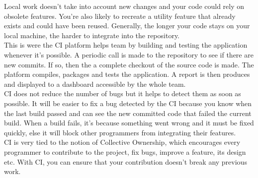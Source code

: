 Local work doesn't take into account new changes and your code could rely
on obsolete features.
You're also likely to recreate a utility feature that already exists and
could have been reused.
Generally, the longer your code stays on your local machine, the harder
to integrate into the repository. \\
\newline
This is were the CI platform helps team by building and testing
the application whenever it's possible.
A periodic call is made to the repository to see if there are new
commits.
If so, then the a complete checkout of the source code is made.
The platform compiles, packages and tests the application.
A report is then produces and displayed to a dashboard accessible by the
whole team. \\
\newline
CI does not reduce the number of bugs but it helps to detect them as soon
as possible.
It will be easier to fix a bug detected by the CI because you know when
the last build passed and can see the new committed code that failed
the current build.
When a build fails, it's because something went wrong and it must be
fixed quickly, else it will block other programmers from integrating
their features. \\
\newline
CI is very tied to the notion of Collective Ownership, which
encourages every programmer to contribute to the project, fix bugs,
improve a feature, its design etc.
With CI, you can ensure that your contribution doesn't break any previous
work.
